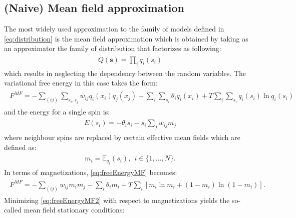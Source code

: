 
\subsection{(Naive) Mean field approximation}
The most widely used approximation to the family of models defined in \ref{eq:distribution} is the mean field approximation which is obtained by taking as an approximator the family of distribution that factorizes as following:
\begin{align}
\begin{split}
Q(\mathbf{s}) = \prod_i q_i(s_i)
\end{split}
\end{align}
which results in neglecting the dependency between the random variables. The variational free energy in this case takes the form:
\begin{align}
\begin{split}
F^{MF} = - \sum_{(ij)} \sum_{s_i, s_j} w_{ij} q_i(x_i)q_j(x_j) - \sum_{i}\sum_{s_i} \theta_i q_i(x_i) + T\sum_i \sum_{s_i} q_i(s_i)\ln q_i(s_i)
\label{eq:freeEnergyMF}
\end{split}
\end{align}
and the energy for a single spin is:
\begin{align}
\begin{split}
E(s_i) = - \theta_i s_i - s_i \sum_j  w_{ij} m_j
\end{split}
\end{align}
where neighbour spins are replaced by certain effective mean fields which are defined as:
 \begin{align}
\begin{split}
m_i = \mathbb{E}_{q_i} (s_i), ~~ i \in \{1, ..., N\}.
\end{split}
\end{align}
 In terms of magnetizations, \ref{eq:freeEnergyMF} becomes:
\begin{align}
\begin{split}
F^{MF} = - \sum_{(ij)} w_{ij} m_i m_j - \sum_{i} \theta_i m_i  + T\sum_i \left[ m_i \ln m_i + (1-m_i)\ln(1-m_i) \right].
\label{eq:freeEnergyMF2}
\end{split}
\end{align}
Minimizing \ref{eq:freeEnergyMF2} with respect to magnetizations yields the so-called mean field stationary conditions:
